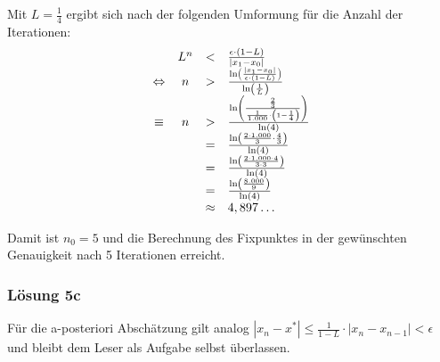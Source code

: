 \documentclass[main.tex]{subfiles}
\begin{document}
Mit $L=\frac{1}{4}$ ergibt sich nach der folgenden Umformung für die Anzahl der Iterationen:
\begin{equation*}
    \begin{array}{ c c c l }
        & L^{n} & <  & \frac{\epsilon \cdot ( 1-L)}{| x_{1} -x_{0}| }\\
        \Leftrightarrow  & n &  > & \frac{\ln\left(\frac{| x_{1} -x_{0}| }{\epsilon \cdot ( 1-L)}\right)}{\ln\left(\frac{1}{L}\right)}\\
        \equiv  & n &  > & \frac{\ln\left(\frac{\frac{2}{3}}{\frac{1}{1.000} \cdot \left( 1-\frac{1}{4}\right)}\right)}{\ln( 4)}\\
        &  & = & \frac{\ln\left(\frac{2\cdot 1.000}{3} \cdot \frac{4}{3}\right)}{\ln( 4)}\\
        &  & = & \frac{\ln\left(\frac{2\cdot 1.000\cdot 4}{3\cdot 3}\right)}{\ln( 4)}\\
        &  & = & \frac{\ln\left(\frac{8.000}{9}\right)}{\ln( 4)}\\
        &  & \approx  & 4,897\dotsc 
    \end{array}
\end{equation*}

Damit ist $n_{0} =5$ und die Berechnung des Fixpunktes in der gewünschten Genauigkeit nach 5 Iterationen erreicht.

\subsubsection{Lösung 5c}

Für die a-posteriori Abschätzung gilt analog $\left| x_{n} -x^{*}\right| \leq \frac{1}{1-L} \cdotp | x_{n} -x_{n-1}| < \epsilon $ und bleibt dem Leser als Aufgabe selbst überlassen.
\end{document}
